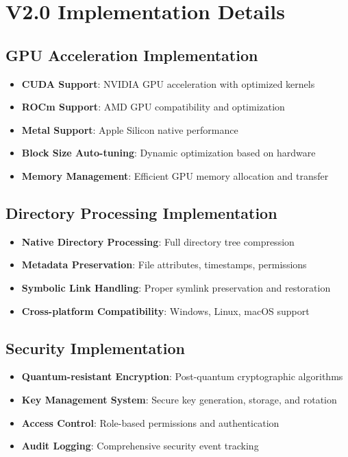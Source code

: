 \documentclass[12pt,a4paper]{article}
\begin{document}
\section{V2.0 Implementation Details}

\subsection{GPU Acceleration Implementation}
\begin{itemize}
    \item \textbf{CUDA Support}: NVIDIA GPU acceleration with optimized kernels
    \item \textbf{ROCm Support}: AMD GPU compatibility and optimization
    \item \textbf{Metal Support}: Apple Silicon native performance
    \item \textbf{Block Size Auto-tuning}: Dynamic optimization based on hardware
    \item \textbf{Memory Management}: Efficient GPU memory allocation and transfer
\end{itemize}

\subsection{Directory Processing Implementation}
\begin{itemize}
    \item \textbf{Native Directory Processing}: Full directory tree compression
    \item \textbf{Metadata Preservation}: File attributes, timestamps, permissions
    \item \textbf{Symbolic Link Handling}: Proper symlink preservation and restoration
    \item \textbf{Cross-platform Compatibility}: Windows, Linux, macOS support
\end{itemize}

\subsection{Security Implementation}
\begin{itemize}
    \item \textbf{Quantum-resistant Encryption}: Post-quantum cryptographic algorithms
    \item \textbf{Key Management System}: Secure key generation, storage, and rotation
    \item \textbf{Access Control}: Role-based permissions and authentication
    \item \textbf{Audit Logging}: Comprehensive security event tracking
\end{itemize}
\end{document}

